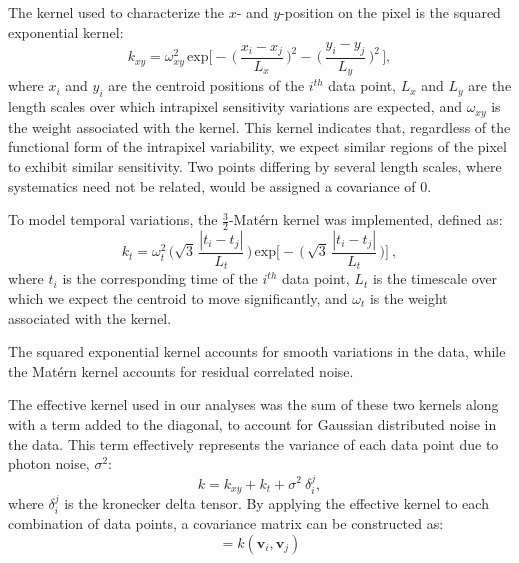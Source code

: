 \documentclass[twocolumn]{aastex61}
\begin{document}
The kernel used to characterize the $x$- and $y$-position on the pixel is the squared exponential kernel:
\begin{equation}
  k_{xy} = \omega_{xy}^{2} \, \mathrm{exp} \bigg[ - \, \Big(\, \frac{x_{i} - x_{j}}{L_x} \, \Big)^{2} - \,\Big(\,\frac{y_{i} - y_{j}}{L_y}\,\Big)^2\,\bigg],
\label{eq:kxy}
\end{equation}
where $x_{i}$ and $y_{i}$ are the centroid positions of the $i^{th}$ data point, $L_{x}$ and $L_{y}$ are the length scales over which intrapixel sensitivity variations are expected, and $\omega_{xy}$ is the weight associated with the kernel. This kernel indicates that, regardless of the functional form of the intrapixel variability, we expect similar regions of the pixel to exhibit similar sensitivity. Two points differing by several length scales, where systematics need not be related, would be assigned a covariance of $0$.

To model temporal variations, the $\frac{3}{2}$-Mat\'ern kernel was implemented, defined as:
\begin{equation}
  k_{t} = \omega_{t}^{2} \, \bigg(\sqrt{3}\,\frac{|t_{i} - t_{j}|}{L_t}\,\bigg)\,\mathrm{exp} \bigg[ - \, \Big(\, \sqrt{3}\,\frac{|t_{i} - t_{j}|}{L_t} \, \Big) \bigg]\ ,
\label{eq:kt}
\end{equation}
where $t_{i}$ is the corresponding time of the $i^{th}$ data point, $L_{t}$ is the timescale over which we expect the centroid to move significantly, and $\omega_{t}$ is the weight associated with the kernel.

The squared exponential kernel accounts for smooth variations in the data, while the Mat\'ern kernel accounts for residual correlated noise.

The effective kernel used in our analyses was the sum of these two kernels along with a term added to the diagonal, to account for Gaussian distributed noise in the data. This term effectively represents the variance of each data point due to photon noise, $\sigma^{2}$:
\begin{equation}
  k = k_{xy} + k_{t} + \sigma^{2}\ \delta_{i}^{j} ,
\end{equation}
where $\delta_{i}^{j}$ is the kronecker delta tensor. By applying the effective kernel to each combination of data points, a covariance matrix can be constructed as:
\begin{equation}
  [\mathrm{K}_{ij}] = k(\boldsymbol{v}_{i},\boldsymbol{v}_{j})
\label{eq:covmat}
\end{equation}
\end{document}
